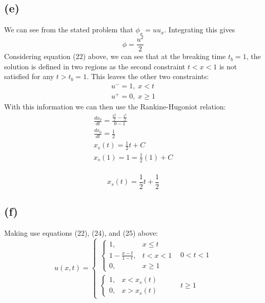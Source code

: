 \documentclass{article}
\begin{document}
\subsection*{(e)}
We can see from the stated problem that $\phi_x = uu_x$. Integrating this gives
\begin{equation}
\phi = \frac{u^2}{2}
\end{equation}
Considering equation (22) above, we can see that at the breaking time $t_b = 1$, the solution is defined in two regions as the second constraint $t < x < 1$ is not satisfied for any $t > t_b = 1$. This leaves the other two constraints:
\begin{equation}
\begin{aligned}
u^- = 1, \; x < t\\
u^+ = 0, \; x \geq 1
\end{aligned}
\end{equation}
With this information we can then use the Rankine-Hugoniot relation:
\begin{equation}
\begin{aligned}
\frac{dx_0}{dt} = \frac{\frac{0^2}{2} - \frac{1^2}{2}}{0 - 1}\\
\frac{dx_0}{dt} = \frac{1}{2}\\
x_s(t) = \frac{1}{2}t + C\\
x_s(1) = 1  = \frac{1}{2}(1) + C\\
\end{aligned}
\end{equation}
\begin{tcolorbox}[minipage,colback=white,arc=0pt,outer arc=0pt]
\begin{equation}
x_s(t) = \frac{1}{2}t + \frac{1}{2}
\end{equation}
\end{tcolorbox}
\subsection*{(f)}
Making use equations (22), (24), and (25) above:
\begin{equation}
  u(x,t)=
  \begin{cases}
    \begin{cases}
      1, & x \leq t \\
      1 - \frac{x-t}{1-t}, & t < x < 1\\
      0, & x \geq 1
    \end{cases}
    &0 < t < 1\\
    \begin{cases}
      1,  & x < x_s(t) \\
      0,  & x > x_s(t)
    \end{cases}
    &t\geq 1
  \end{cases}
\end{equation}
\end{document}
